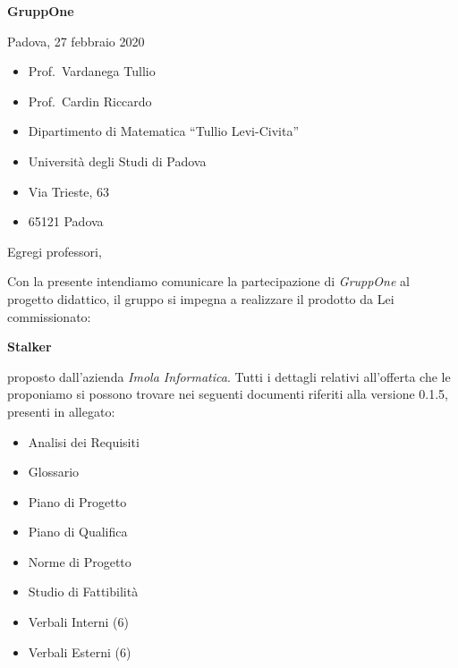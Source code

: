 \documentclass{article}
\begin{document}
\begin{center}
  {\LARGE \textbf{GruppOne}}
\end{center}

\begin{multicols}{2}
  Padova, 27 febbraio 2020
  \columnbreak{}
  \begin{itemize}
    \setlength{\itemsep}{0mm}
    \setlength{\parskip}{0mm}
    \renewcommand{\labelitemi}{}
    \item Prof.\ Vardanega Tullio
    \item Prof.\ Cardin Riccardo
    \item Dipartimento di Matematica ``Tullio Levi-Civita''
    \item Università degli Studi di Padova
    \item Via Trieste, 63
    \item 65121 Padova
  \end{itemize}
\end{multicols}
Egregi professori,

Con la presente intendiamo comunicare la partecipazione di \textit{GruppOne} al progetto didattico, il gruppo si impegna a realizzare il prodotto da Lei commissionato:
\begin{center}
  \textbf{Stalker}
\end{center}
proposto dall'azienda \textit{Imola Informatica}.
Tutti i dettagli relativi all'offerta che le proponiamo si possono trovare nei seguenti documenti riferiti alla versione 0.1.5, presenti in allegato:
\begin{itemize}
  \item Analisi dei Requisiti
  \item Glossario
  \item Piano di Progetto
  \item Piano di Qualifica
  \item Norme di Progetto
  \item Studio di Fattibilità
  \item Verbali Interni (6)
  \item Verbali Esterni (6)
\end{itemize}
\end{document}
